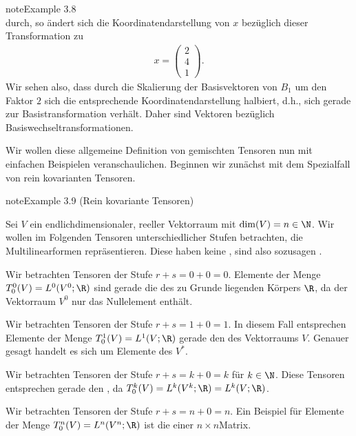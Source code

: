 \documentclass[letterpaper,10pt,german]{jupyterBook}
\begin{document}
\begin{sphinxadmonition}{note}{Example 3.8}
\begin{equation*}
\end{equation*}
\sphinxAtStartPar
durch, so ändert sich die Koordinatendarstellung von \(x\) bezüglich dieser Transformation zu
\begin{equation*}
\begin{split}x = \begin{pmatrix}2\\ 4\\ 1\end{pmatrix}.\end{split}
\end{equation*}
\sphinxAtStartPar
Wir sehen also, dass durch die Skalierung der Basisvektoren von \(B_1\) um den Faktor \(2\) sich die entsprechende Koordinatendarstellung halbiert, d.h., sich gerade  zur Basistransformation verhält.
Daher sind Vektoren  bezüglich Basiswechseltransformationen.
\end{sphinxadmonition}

\sphinxAtStartPar
Wir wollen diese allgemeine Definition von gemischten Tensoren nun mit einfachen Beispielen veranschaulichen.
Beginnen wir zunächst mit dem Spezialfall von rein kovarianten Tensoren.
\label{vektoranalysis/tensor:example-22}
\begin{sphinxadmonition}{note}{Example 3.9 (Rein kovariante Tensoren)}



\sphinxAtStartPar
Sei \(V\) ein endlich\sphinxhyphen{}dimensionaler, reeller Vektorraum mit \(\operatorname{dim}(V) = n \in \N\).
Wir wollen im Folgenden Tensoren unterschiedlicher Stufen betrachten, die Multilinearformen repräsentieren.
Diese haben keine , sind also sozusagen .

\sphinxAtStartPar
{}
Wir betrachten Tensoren der Stufe \(r+s=0+0=0\).
Elemente der Menge \(T^0_0(V) = L^0(V^0; \R)\) sind gerade die  des zu Grunde liegenden Körpers \(\R\), da der Vektorraum \(V^0\) nur das Nullelement enthält.

\sphinxAtStartPar
{}
Wir betrachten Tensoren der Stufe \(r+s=1+0=1\).
In diesem Fall entsprechen Elemente der Menge \(T^1_0(V) = L^1(V; \R)\) gerade den  des Vektorraums \(V\).
Genauer gesagt handelt es sich um Elemente des  \(V^\ast\).

\sphinxAtStartPar
{}
Wir betrachten Tensoren der Stufe \(r+s=k+0=k\) für \(k\in \N\).
Diese Tensoren entsprechen gerade den , da \(T^k_0(V) = L^k(V^k; \R) = L^k(V; \R)\).

\sphinxAtStartPar
{}
Wir betrachten Tensoren der Stufe \(r+s=n+0=n\).
Ein Beispiel für Elemente der Menge \(T^n_0(V) = L^n(V^n; \R)\) ist die  einer \(n \times n\)\sphinxhyphen{}Matrix.
\end{sphinxadmonition}
\end{document}
